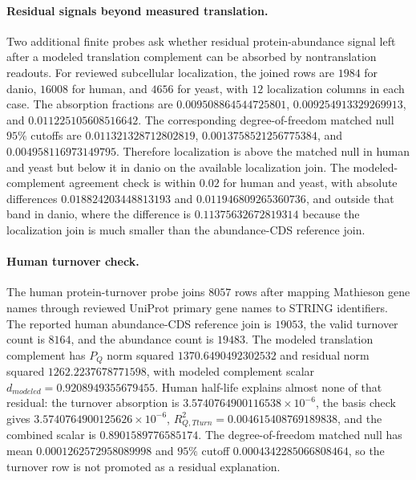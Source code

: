 \paragraph{Residual signals beyond measured translation.}
Two additional finite probes ask whether residual protein-abundance signal left after a modeled translation complement can be absorbed by nontranslation readouts.  For reviewed subcellular localization, the joined rows are $1984$ for danio, $16008$ for human, and $4656$ for yeast, with $12$ localization columns in each case.  The absorption fractions are $0.009508864544725801$, $0.009254913329269913$, and $0.011225105608516642$.  The corresponding degree-of-freedom matched null $95\%$ cutoffs are $0.011321328712802819$, $0.0013758521256775384$, and $0.004958116973149795$.  Therefore localization is above the matched null in human and yeast but below it in danio on the available localization join.  The modeled-complement agreement check is within $0.02$ for human and yeast, with absolute differences $0.018824203448813193$ and $0.011946809265360736$, and outside that band in danio, where the difference is $0.11375632672819314$ because the localization join is much smaller than the abundance-CDS reference join.

\paragraph{Human turnover check.}
The human protein-turnover probe joins $8057$ rows after mapping Mathieson gene names through reviewed UniProt primary gene names to STRING identifiers.  The reported human abundance-CDS reference join is $19053$, the valid turnover count is $8164$, and the abundance count is $19483$.  The modeled translation complement has $P_Q$ norm squared $1370.6490492302532$ and residual norm squared $1262.2237678771598$, with modeled complement scalar $d_{modeled}=0.9208949355679455$.  Human half-life explains almost none of that residual: the turnover absorption is $3.5740764900116538\times 10^{-6}$, the basis check gives $3.5740764900125626\times 10^{-6}$, $R^2_{Q,Tturn}=0.004615408769189838$, and the combined scalar is $0.8901589776585174$.  The degree-of-freedom matched null has mean $0.0001262572958089998$ and $95\%$ cutoff $0.0004342285066808464$, so the turnover row is not promoted as a residual explanation.

